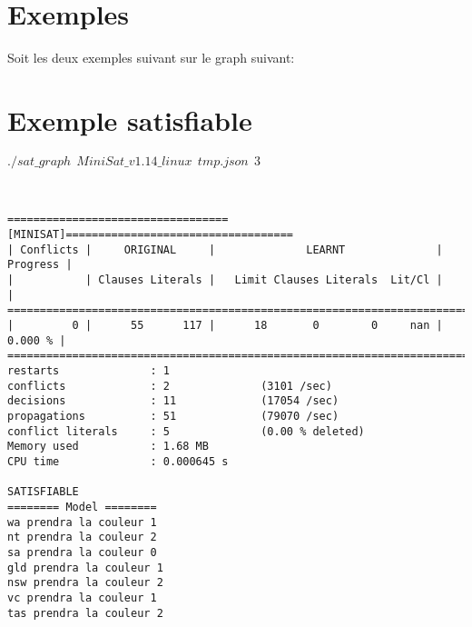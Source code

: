 \documentclass[french, 12pt]{report}
\newcommand{\formula}[1]{
\begin{center}
{#1}
\end{center}
}
\begin{document}
\pagebreak

\section{Exemples}
Soit les deux exemples suivant sur le graph suivant:

\pagebreak

\section{Exemple satisfiable}

\formula{$./sat\_graph\ \ MiniSat\_v1.14\_linux\ \ tmp.json\ \ 3$}
\ \\
\begin{lstlisting}
==================================[MINISAT]===================================
| Conflicts |     ORIGINAL     |              LEARNT              | Progress |
|           | Clauses Literals |   Limit Clauses Literals  Lit/Cl |          |
==============================================================================
|         0 |      55      117 |      18       0        0     nan |  0.000 % |
==============================================================================
restarts              : 1
conflicts             : 2              (3101 /sec)
decisions             : 11             (17054 /sec)
propagations          : 51             (79070 /sec)
conflict literals     : 5              (0.00 % deleted)
Memory used           : 1.68 MB
CPU time              : 0.000645 s

SATISFIABLE
======== Model ========
wa prendra la couleur 1
nt prendra la couleur 2
sa prendra la couleur 0
gld prendra la couleur 1
nsw prendra la couleur 2
vc prendra la couleur 1
tas prendra la couleur 2

\end{lstlisting}\pagebreak
\end{document}
